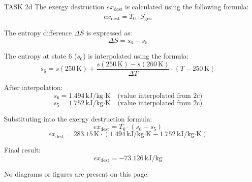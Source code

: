 TASK 2d  
The exergy destruction \( ex_{\text{dest}} \) is calculated using the following formula:  
\[
ex_{\text{dest}} = T_0 \cdot \dot{S}_{\text{gen}}
\]  

The entropy difference \( \Delta S \) is expressed as:  
\[
\Delta S = s_6 - s_5
\]  

The entropy at state 6 (\( s_6 \)) is interpolated using the formula:  
\[
s_6 = s(250 \, \text{K}) + \frac{s(250 \, \text{K}) - s(260 \, \text{K})}{\Delta T} \cdot (T - 250 \, \text{K})
\]  

After interpolation:  
\[
s_6 = 1.494 \, \text{kJ/kg·K} \quad \text{(value interpolated from 2c)}
\]  
\[
s_5 = 1.752 \, \text{kJ/kg·K} \quad \text{(value interpolated from 2c)}
\]  

Substituting into the exergy destruction formula:  
\[
ex_{\text{dest}} = T_0 \cdot (s_6 - s_5)
\]  
\[
ex_{\text{dest}} = 283.15 \, \text{K} \cdot (1.494 \, \text{kJ/kg·K} - 1.752 \, \text{kJ/kg·K})
\]  

Final result:  
\[
ex_{\text{dest}} = -73.126 \, \text{kJ/kg}
\]  

No diagrams or figures are present on this page.